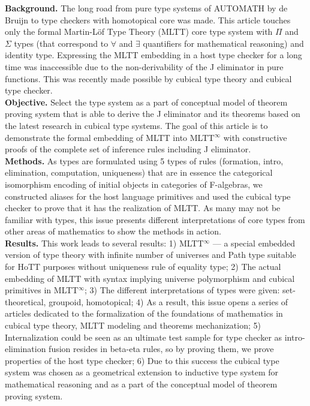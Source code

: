 \documentclass[twocolumn,10pt]{article}
\theoremstyle{definition}
\begin{document}
\begin{@twocolumnfalse}
{\bf Background.} The long road from pure type systems of AUTOMATH by de Bruijn to type
checkers with homotopical core was made. This article touches only
the formal Martin-Löf Type Theory (MLTT) core type system with $\Pi$ and $\Sigma$ types (that correspond
to $\forall$ and $\exists$ quantifiers for mathematical reasoning) and identity type.
Expressing the MLTT embedding in a host type checker for a long time was
inaccessible due to the non-derivability of the J eliminator in pure functions.
This was recently made possible by cubical type theory and cubical type checker.\\
{\bf Objective.} Select the type system as a part of conceptual model of theorem proving system that is
able to derive the J eliminator and its theorems based on the latest research in cubical type systems.
The goal of this article is to demonstrate the formal embedding of MLTT into MLTT$^{\infty}$ with constructive proofs
of the complete set of inference rules including J eliminator.\\
{\bf Methods.}
As types are formulated using 5 types of rules (formation, intro, elimination, computation, uniqueness)
that are in essence the categorical isomorphism encoding of initial objects in categories of F-algebras,
we constructed aliases for the host language primitives and used the cubical type checker to prove that it has
the realization of MLTT.
As many may not be familiar with types, this issue presents different interpretations of core types from
other areas of mathematics to show the methods in action.\\
{\bf Results.} This work leads to several results:
1) MLTT$^{\infty}$ --- a special embedded version of type theory with infinite number of universes and Path type suitable for HoTT purposes without uniqueness rule of equality type;
2) The actual embedding of MLTT with syntax implying universe polymorphism and cubical primitives in MLTT$^{\infty}$;
3) The different interpretations of types were given: set-theoretical, groupoid, homotopical;
4) As a result, this issue opens a series of articles dedicated to the formalization of the foundations of mathematics in cubical type theory, MLTT modeling and theorems mechanization;
5) Internalization could be seen as an ultimate test sample for type checker as intro-elimination fusion resides in beta-eta rules, so by proving them, we prove properties of the host type checker;
6) Due to this success the cubical type system was chosen as a geometrical extension to inductive type system for mathematical reasoning and as a part of the conceptual model of theorem proving system.\\

\end{@twocolumnfalse}
\end{document}
